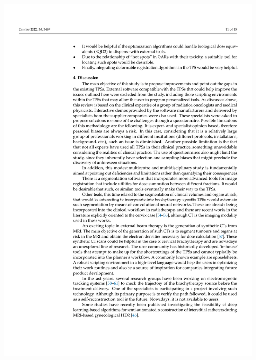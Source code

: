 \documentclass[
  a4paper,
]{scrreprt}
\begin{document}
\includegraphics{articulos/cancers/cancers-11.png}
\end{document}
